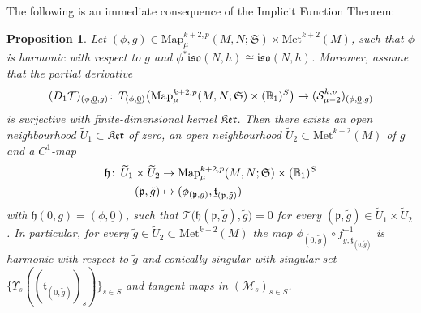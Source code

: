 \documentclass{article}
\numberwithin{equation}{section}        %
\theoremstyle{bfnote}
\newtheorem{prop}[thm]{Proposition}         %
\theoremstyle{definition}
\theoremstyle{bfremark}
\newcommand{\col}{\colon \thinspace}        %
\newcommand{\Map}{\mathrm{Map}}             %
\newcommand{\Met}{\mathrm{Met}}             %
\begin{document}
The following is an immediate consequence of the Implicit Function Theorem:

\begin{prop}    \label{prop: deformation theorem via IFT}
    Let $(\phi,g) \in \Map^{k+2,p}_\mu(M,N;\mathfrak{S}) \times \Met^{k+2}(M)$, such that $\phi$ is harmonic with respect to $g$ and $\phi^*\mathfrak{iso}(N,h) \cong \mathfrak{iso}(N,h)$. Moreover, assume that the partial derivative 
    \begin{align*}
        (D_1 \mathcal{T})_{(\phi,\underline{0},g)} \col T_{(\phi,\underline{0})} \big(\Map^{k+2,p}_\mu(M,N;\mathfrak{S}) \times (\mathbb{B}_1)^S\big) \to (\mathcal{S}^{k,p}_{\mu-2})_{(\phi,\underline{0},g)}
    \end{align*}
    is surjective with finite-dimensional kernel $\mathfrak{Ker}$. Then there exists an open neighbourhood $\widetilde{U}_1 \subset \mathfrak{Ker}$ of zero, an open neighbourhood $\widetilde{U}_2 \subset \Met^{k+2}(M)$ of $g$ and a $C^1$-map 
    \begin{align*}
         \mathfrak{h} \col \widetilde{U}_1 \times \widetilde{U}_2 &\to \Map^{k+2,p}_\mu(M,N;\mathfrak{S}) \times (\mathbb{B}_1)^S \\
         (\mathfrak{p},\tilde{g}) &\mapsto (\phi_{(\mathfrak{p},\tilde{g})},\underline{\mathfrak{t}}_{(\mathfrak{p},\tilde{g})})
    \end{align*} 
    with $\mathfrak{h}(0,g) = (\phi,\underline{0})$, such that $\mathcal{T}(\mathfrak{h}(\mathfrak{p},\tilde{g}),\tilde{g}\big) = 0$ for every $(\mathfrak{p},\tilde{g}) \in \widetilde{U}_1 \times \widetilde{U}_2$. In particular, for every $\tilde{g} \in \widetilde{U}_2 \subset \Met^{k+2}(M)$ the map $\phi_{(0,\tilde{g})} \circ f_{\tilde{g},\underline{\mathfrak{t}}_{(0,\tilde{g})}}^{-1}$ is harmonic with respect to $\tilde{g}$ and conically singular with singular set $\{\Upsilon_s((\mathfrak{t}_{(0,\tilde{g})})_s)\}_{s\in S}$ and tangent maps in $(\mathcal{M}_s)_{s\in S}$.
\end{prop}
\end{document}
